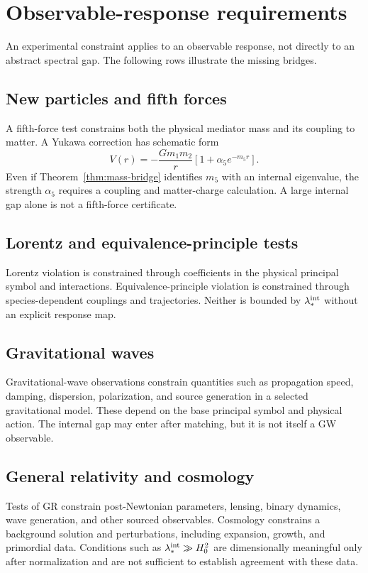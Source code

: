 \documentclass[11pt]{article}
\begin{document}
\section{Observable-response requirements}

An experimental constraint applies to an observable response, not directly to
an abstract spectral gap. The following rows illustrate the missing bridges.

\subsection{New particles and fifth forces}

A fifth-force test constrains both the physical mediator mass and its coupling
to matter. A Yukawa correction has schematic form
\[
 V(r)=-\frac{Gm_1m_2}{r}
 \left[1+\alpha_5e^{-m_5r}\right].
\]
Even if Theorem~\ref{thm:mass-bridge} identifies $m_5$ with an internal
eigenvalue, the strength $\alpha_5$ requires a coupling and matter-charge
calculation. A large internal gap alone is not a fifth-force certificate.

\subsection{Lorentz and equivalence-principle tests}

Lorentz violation is constrained through coefficients in the physical
principal symbol and interactions. Equivalence-principle violation is
constrained through species-dependent couplings and trajectories. Neither is
bounded by $\lambda_\ast^{\rm int}$ without an explicit response map.

\subsection{Gravitational waves}

Gravitational-wave observations constrain quantities such as propagation
speed, damping, dispersion, polarization, and source generation in a selected
gravitational model. These depend on the base principal symbol and physical
action. The internal gap may enter after matching, but it is not itself a GW
observable.

\subsection{General relativity and cosmology}

Tests of GR constrain post-Newtonian parameters, lensing, binary dynamics,
wave generation, and other sourced observables. Cosmology constrains a
background solution and perturbations, including expansion, growth, and
primordial data. Conditions such as
$\lambda_\ast^{\rm int}\gg H_0^2$ are dimensionally meaningful only after
normalization and are not sufficient to establish agreement with these data.
\end{document}

